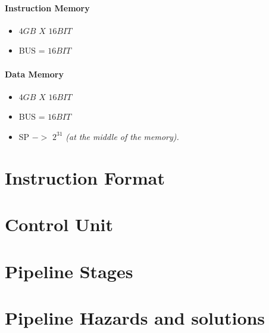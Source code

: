 \documentclass[12pt]{report}
\begin{document}
\subsection{Instruction Memory}
\begin{itemize}
    \item $4GB$ $X$ $16BIT$
    \item BUS = $16BIT$
\end{itemize}

\subsection{Data Memory}
\begin{itemize}
    \item $4GB$ $X$ $16BIT$
    \item BUS = $16BIT$
    \item SP $->$ $2^{31}$ \emph{(at the middle of the memory).}
\end{itemize}

\part{Instruction Format}

\part{Control Unit}

\part{Pipeline Stages}

\part{Pipeline Hazards and solutions}
\end{document}
